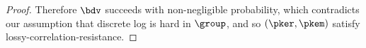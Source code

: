 \begin{proof}
	Therefore $\bdv$ succeeds with non-negligible probability, which contradicts our assumption that discrete log is hard in $\group$, and so $(\pker, \pkem)$ satisfy lossy-correlation-resistance.
\end{proof}

